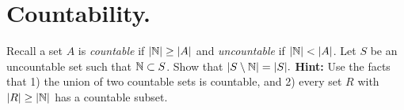 
\newtheorem{theorem}{Theorem}
\newtheorem{lemma}[theorem]{Lemma}
\newtheorem{definition}{Definition}[section]


\maketitle
\thispagestyle{firststyle}
\vspace{-2.0cm}

\section{Countability.}
    Recall a set $A$ is \emph{countable} if $|\mathbb{N}| \geq |A|$ and \emph{uncountable} if $|\mathbb{N}| < |A|$.
    Let $S$ be an uncountable set such that $\mathbb{N} \subset S$.
    Show that $|S \setminus \mathbb{N}| = |S|.$
    {\bf Hint:}
    Use the facts that
    1) the union of two countable sets is countable,
    and
    2) every set $R$ with $|R| \geq |\mathbb{N}|$ has a countable subset.




